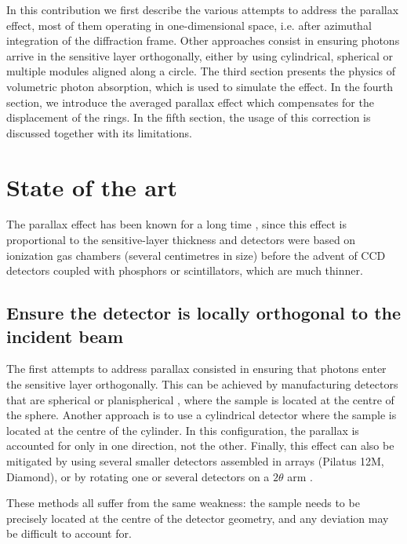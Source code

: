 \documentclass[preprint,pdf]{iucr}              %
\begin{document}
In this contribution we first describe the various attempts to address the parallax effect, most of them operating in one-dimensional space, i.e. after azimuthal integration of the diffraction frame.
Other approaches consist in ensuring photons arrive in the sensitive layer orthogonally, either by using cylindrical, spherical or multiple modules aligned along a circle.
The third section presents the physics of volumetric photon absorption, which is used to simulate the effect.
In the fourth section, we introduce the averaged parallax effect which compensates for the displacement of the rings. 
In the fifth section, the usage of this correction is discussed together with its limitations.

\section{State of the art}
The parallax effect has been known for a long time \cite{fit2d1994}, since this effect is proportional to the
sensitive-layer thickness and detectors were based on ionization gas chambers (several centimetres in size)
before the advent of CCD detectors coupled with phosphors or scintillators, which are much thinner.

     \subsection{Ensure the detector is locally orthogonal to the incident beam}

The first attempts to address parallax consisted in ensuring that photons enter the sensitive layer orthogonally.
This can be achieved by manufacturing detectors that are spherical \cite{spherical_detector} or
planispherical \cite{planispherical}, where the sample is located at the centre of the sphere.
Another approach is to use a cylindrical detector \cite{cylindrical_detector} where the sample is
located at the centre of the cylinder.
In this configuration, the parallax is accounted for only in one direction, not the other.
Finally, this effect can also be mitigated by using several smaller detectors assembled in
arrays (Pilatus 12M, Diamond), or by rotating one or several detectors on a $2\theta$ arm \cite{multi-detector}.

These methods all suffer from the same weakness: the sample needs to be precisely located
at the centre of the detector geometry, and any deviation may be difficult to account for.
\end{document}
